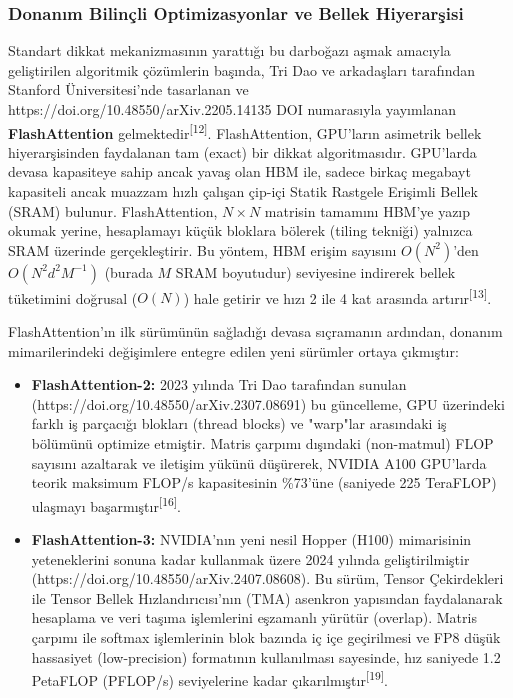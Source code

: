 \documentclass[11pt,a4paper]{article}
\begin{document}
\subsubsection{Donanım Bilinçli Optimizasyonlar ve Bellek Hiyerarşisi}
Standart dikkat mekanizmasının yarattığı bu darboğazı aşmak amacıyla geliştirilen algoritmik çözümlerin başında, Tri Dao ve arkadaşları tarafından Stanford Üniversitesi'nde tasarlanan ve https://doi.org/10.48550/arXiv.2205.14135 DOI numarasıyla yayımlanan \textbf{FlashAttention} gelmektedir\textsuperscript{[12]}. FlashAttention, GPU'ların asimetrik bellek hiyerarşisinden faydalanan tam (exact) bir dikkat algoritmasıdır. GPU'larda devasa kapasiteye sahip ancak yavaş olan HBM ile, sadece birkaç megabayt kapasiteli ancak muazzam hızlı çalışan çip-içi Statik Rastgele Erişimli Bellek (SRAM) bulunur. FlashAttention, \(N \times N\) matrisin tamamını HBM'ye yazıp okumak yerine, hesaplamayı küçük bloklara bölerek (tiling tekniği) yalnızca SRAM üzerinde gerçekleştirir. Bu yöntem, HBM erişim sayısını \(O(N^2)\)'den \(O(N^2 d^2 M^{-1})\) (burada \(M\) SRAM boyutudur) seviyesine indirerek bellek tüketimini doğrusal (\(O(N)\)) hale getirir ve hızı 2 ile 4 kat arasında artırır\textsuperscript{[13]}.

FlashAttention'ın ilk sürümünün sağladığı devasa sıçramanın ardından, donanım mimarilerindeki değişimlere entegre edilen yeni sürümler ortaya çıkmıştır:

\begin{itemize}
  \item \textbf{FlashAttention-2:} 2023 yılında Tri Dao tarafından sunulan (https://doi.org/10.48550/arXiv.2307.08691) bu güncelleme, GPU üzerindeki farklı iş parçacığı blokları (thread blocks) ve "warp"lar arasındaki iş bölümünü optimize etmiştir. Matris çarpımı dışındaki (non-matmul) FLOP sayısını azaltarak ve iletişim yükünü düşürerek, NVIDIA A100 GPU'larda teorik maksimum FLOP/s kapasitesinin \%73'üne (saniyede 225 TeraFLOP) ulaşmayı başarmıştır\textsuperscript{[16]}.
  \item \textbf{FlashAttention-3:} NVIDIA'nın yeni nesil Hopper (H100) mimarisinin yeteneklerini sonuna kadar kullanmak üzere 2024 yılında geliştirilmiştir (https://doi.org/10.48550/arXiv.2407.08608). Bu sürüm, Tensor Çekirdekleri ile Tensor Bellek Hızlandırıcısı'nın (TMA) asenkron yapısından faydalanarak hesaplama ve veri taşıma işlemlerini eşzamanlı yürütür (overlap). Matris çarpımı ile softmax işlemlerinin blok bazında iç içe geçirilmesi ve FP8 düşük hassasiyet (low-precision) formatının kullanılması sayesinde, hız saniyede 1.2 PetaFLOP (PFLOP/s) seviyelerine kadar çıkarılmıştır\textsuperscript{[19]}.
\end{itemize}
\end{document}
